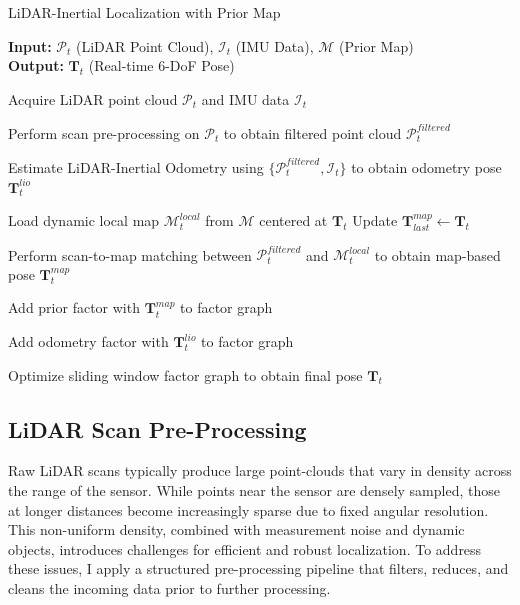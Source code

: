 \begin{algorithm}[H]
	\caption{LiDAR-Inertial Localization with Prior Map}
	\label{alg:localization-system}
	
	\textbf{Input:} $\mathcal{P}_t$ (LiDAR Point Cloud), $\mathcal{I}_t$ (IMU Data), $\mathcal{M}$ (Prior Map)\\
	\textbf{Output:} $\mathbf{T}_t$ (Real-time 6-DoF Pose)
	
	\begin{algorithmic}[1]
		
		
		\State Acquire LiDAR point cloud $\mathcal{P}_t$ and IMU data $\mathcal{I}_t$
		
		\State Perform scan pre-processing on $\mathcal{P}_t$ to obtain filtered point cloud $\mathcal{P}_t^{filtered}$
		
		\State Estimate LiDAR-Inertial Odometry using $\{\mathcal{P}_t^{filtered}, \mathcal{I}_t\}$ to obtain odometry pose $\mathbf{T}_t^{lio}$	
		
		\State Load dynamic local map $\mathcal{M}_t^{local}$ from $\mathcal{M}$ centered at $\mathbf{T}_t$
		\State Update $\mathbf{T}_{last}^{map} \gets \mathbf{T}_t$
		\EndIf
		
		\State Perform scan-to-map matching between $\mathcal{P}_t^{filtered}$ and $\mathcal{M}_t^{local}$ to obtain map-based pose $\mathbf{T}_t^{map}$
		
		\State Add prior factor with $\mathbf{T}_t^{map}$ to factor graph
		\EndIf
		
		\State Add odometry factor with $\mathbf{T}_t^{lio}$ to factor graph
		
		\State Optimize sliding window factor graph to obtain final pose $\mathbf{T}_t$
		
		\EndWhile
		
	\end{algorithmic}
\end{algorithm}



\subsection{LiDAR Scan Pre-Processing}

Raw LiDAR scans typically produce large point-clouds that vary in density across the range of the sensor. While points near the sensor are densely sampled, those at longer distances become increasingly sparse due to fixed angular resolution. This non-uniform density, combined with measurement noise and dynamic objects, introduces challenges for efficient and robust localization. To address these issues, I apply a structured pre-processing pipeline that filters, reduces, and cleans the incoming data prior to further processing.

